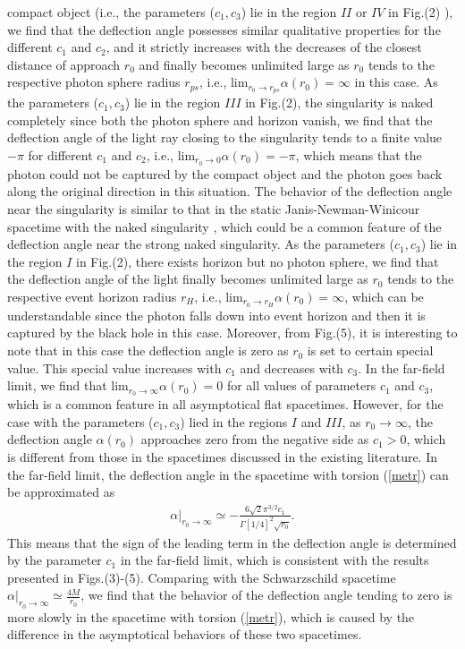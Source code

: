 \documentclass[aps,showpacs,preprintnumbers,amsmath,amssymb]{revtex4}
\begin{document}
compact object (i.e., the parameters ($c_1, c_3$) lie in the region $II$ or $IV$ in Fig.(2) ), we find that the deflection angle possesses similar qualitative properties for the different $c_1$ and $c_2$, and it strictly increases with the decreases
of the closest distance of approach $r_{0}$ and finally becomes unlimited large as $r_{0}$ tends to the respective photon sphere radius
$r_{ps}$, i.e., $\text{lim}_{r_0\rightarrow r_{ps}}\alpha(r_{0})=\infty$ in this case. As the parameters ($c_1, c_3$)  lie in the region $III$ in Fig.(2), the singularity is naked completely since both the photon sphere and horizon vanish, we find that the deflection angle of the light
ray closing to the singularity tends to a finite value $-\pi$ for different $c_1$ and $c_2$, i.e., $\text{lim}_{r_0\rightarrow 0}\alpha(r_{0})=-\pi$, which means that the photon could not be captured by the compact object and the photon goes back along the original direction in this situation. The behavior of the deflection angle near the singularity is similar to that in the static Janis-Newman-Winicour spacetime with the naked singularity \cite{KS4,Gyulchev1}, which could be a common feature of the deflection angle near the strong naked singularity.
 As the parameters ($c_1, c_3$)  lie in the region $I$ in Fig.(2),
there exists horizon but no photon sphere, we find that the deflection angle of the light finally becomes unlimited large as $r_{0}$ tends to the respective event horizon radius
$r_{H}$, i.e., $\text{lim}_{r_0\rightarrow r_{H}}\alpha(r_{0})=\infty$, which can be understandable since the photon falls down into event horizon and then it is captured by the black hole in this case. Moreover, from Fig.(5), it is interesting to note that in this case the deflection angle is zero as $r_{0}$ is set to certain special value. This special value increases with $c_1$ and decreases with $c_3$. In the far-field limit, we find that $\text{lim}_{r_0\rightarrow\infty}\alpha(r_{0})=0$
for all values of parameters $c_1$ and $c_3$, which is a common feature in all asymptotical flat spacetimes. However, for the case with the parameters ($c_1, c_3$) lied in the regions $I$ and $III$, as $r_0\rightarrow\infty$, the deflection angle $\alpha(r_{0})$ approaches zero from the negative side as $c_1>0$, which is different from those in the spacetimes discussed in the existing literature. In the far-field limit, the deflection angle in the spacetime with torsion (\ref{metr}) can be approximated as
\begin{eqnarray}
\alpha|_{r_0\rightarrow\infty}\simeq-\frac{6\sqrt{2}\pi^{3/2}c_1}{\Gamma[1/4]^2 \sqrt{r_0}}.
\end{eqnarray}
This means that the sign of the leading term in the deflection angle is determined by the parameter $c_1$ in the far-field limit, which is consistent with the results presented in Figs.(3)-(5). Comparing with the Schwarzschild spacetime $\alpha|_{r_0\rightarrow\infty}\simeq \frac{4M}{r_0}$, we find that the behavior of the deflection angle tending to zero is more slowly in the spacetime with torsion (\ref{metr}), which is caused by the difference in the asymptotical behaviors of these two spacetimes.
\end{document}
